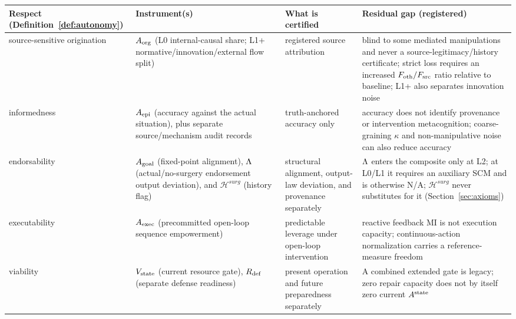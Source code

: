 \begin{center}
\small
\begin{tabularx}{\textwidth}{@{}l >{\raggedright\arraybackslash}X
>{\raggedright\arraybackslash}X >{\raggedright\arraybackslash}X@{}}
\toprule
Respect (Definition~\ref{def:autonomy}) & Instrument(s) & What is certified
& Residual gap (registered) \\
\midrule
source-sensitive origination & $A_{\mathrm{org}}$ (L0 internal-causal share; L1+
normative/innovation/external flow split) & registered source attribution &
blind to some mediated manipulations and never a source-legitimacy/history
certificate; strict loss requires an increased
$F_{\mathrm{oth}}/F_{\mathrm{src}}$ ratio relative to baseline; L1+ also separates innovation noise \\
informedness & $A_{\mathrm{epi}}$ (accuracy against the actual situation), plus separate
source/mechanism audit records & truth-anchored accuracy only & accuracy does
not identify provenance or intervention metacognition; coarse-graining $\kappa$
and non-manipulative noise can also reduce accuracy \\
endorsability & $A_{\mathrm{goal}}$ (fixed-point alignment), $\Lambda$ (actual/no-surgery
endorsement output deviation), and $\mathcal H^{surg}$ (history flag) &
structural alignment, output-law deviation, and provenance separately &
$\Lambda$ enters the composite only at L2; at L0/L1 it requires an auxiliary SCM
and is otherwise N/A; $\mathcal H^{surg}$ never substitutes for it
(Section~\ref{sec:axioms}) \\
executability & $A_{\mathrm{exec}}$ (precommitted open-loop sequence empowerment) &
predictable leverage under open-loop intervention & reactive feedback MI is
not execution capacity; continuous-action normalization carries a
reference-measure freedom \\
viability & $V_{\mathrm{state}}$ (current resource gate), $R_{\mathrm{def}}$ (separate defense
readiness) & present operation and future preparedness separately & A combined
extended gate is legacy; zero repair capacity does not by itself zero
current $A^{\mathrm{state}}$ \\
\bottomrule
\end{tabularx}
\end{center}

